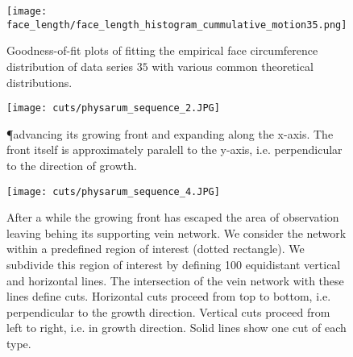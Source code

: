\begin{figure}[!htbp]
\begin{center}%
  \texttt{[image: face\_length/face\_length\_histogram\_cummulative\_motion35.png]}
\end{center}%
\caption[Goodness-of-fit plots: face circumference]{Goodness-of-fit plots of fitting the empirical face circumference distribution of data series $35$ with various common theoretical distributions.}
\label{fig:sup::face_length_goodness}
\end{figure}

\begin{figure}[!htbp]
\begin{center}%
  \texttt{[image: cuts/physarum\_sequence\_2.JPG]}
\end{center}%
\caption[\P advancing the apical zone]{\P advancing its growing front and expanding along the x-axis. The front itself is approximately paralell to the y-axis, i.e. perpendicular to the direction of growth. }
\label{fig:sup::physarum_expanding}
\end{figure}

\begin{figure}[!htbp]
\begin{center}%
  \texttt{[image: cuts/physarum\_sequence\_4.JPG]}
\end{center}%
\caption[Horizontal and vertical cuts illustrated]{After a while the growing front has escaped the area of observation leaving behing its supporting vein network. We consider the network within a predefined region of interest (dotted rectangle). We subdivide this region of interest by defining 100 equidistant vertical and horizontal lines. The intersection of the vein network with these lines define cuts. Horizontal cuts proceed from top to bottom, i.e. perpendicular to the growth direction. Vertical cuts proceed from left to right, i.e. in growth direction. Solid lines show one cut of each type.}
\label{fig:sup::physarum_roi}
\end{figure}
